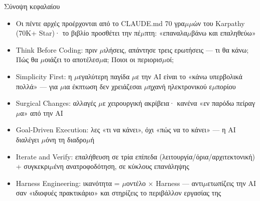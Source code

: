 \begin{tcbsummary}{Σύνοψη κεφαλαίου}
\begin{itemize}
  \item Οι πέντε αρχές προέρχονται από το CLAUDE.md 70 γρα$\mu$$\mu$ών του Karpathy (70K+ Star)· το βιβλίο προσθέτει την πέ$\mu$πτη: «επαναλα$\mu$βάνω και επαληθεύω»
  \item Think Before Coding: πριν $\mu$ιλήσεις, απάντησε τρεις ερωτήσεις — τι θα κάνω; Πώς θα $\mu$οιάζει το αποτέλεσ$\mu$α; Ποιοι οι περιορισ$\mu$οί;
  \item Simplicity First: η $\mu$εγαλύτερη παγίδα $\mu$ε την AI είναι το «κάνω υπερβολικά πολλά» — για $\mu$ια έκπτωση δεν χρειάζεσαι $\mu$ηχανή ηλεκτρονικού ε$\mu$πορίου
  \item Surgical Changes: αλλαγές $\mu$ε χειρουργική ακρίβεια· κανένα «εν παρόδω πείραγ$\mu$α» από την AI
  \item Goal-Driven Execution: λες «τι να κάνει», όχι «πώς να το κάνει» — η AI διαλέγει $\mu$όνη τη διαδρο$\mu$ή
  \item Iterate and Verify: επαλήθευση σε τρία επίπεδα (λειτουργία/όρια/αρχιτεκτονική) + συγκεκρι$\mu$ένη ανατροφοδότηση, σε κύκλους επανάληψης
  \item Harness Engineering: ικανότητα = $\mu$οντέλο × Harness — αντι$\mu$ετωπίζεις την AI σαν «ιδιοφυές πρακτικάριο» και στηρίζεις το περιβάλλον εργασίας της
\end{itemize}

\end{tcbsummary}
